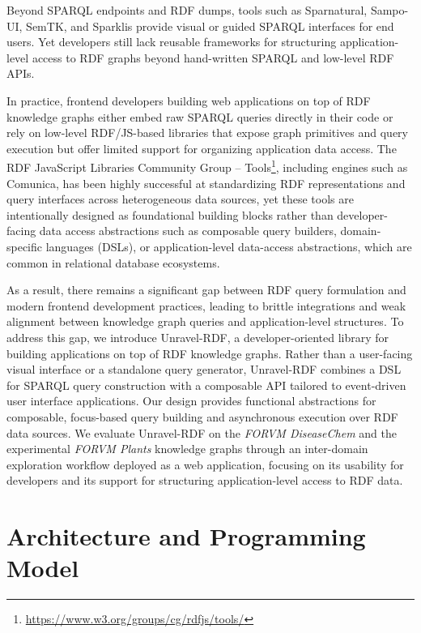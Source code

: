 \documentclass[
]{ceurart}
\begin{document}
Beyond SPARQL endpoints and RDF dumps, tools such as Sparnatural\citep{francart_sparnatural_2023}, 
Sampo-UI\citep{ikkala_sampo-ui_2021}, SemTK\citep{cuddihy_semtk_2017}, and Sparklis\citep{ferre_sparklis_2016} 
provide visual or guided SPARQL interfaces for end users. Yet developers still
lack reusable frameworks for structuring application-level access to RDF graphs
beyond hand-written SPARQL and low-level RDF APIs.

In practice, frontend developers building web applications on top of RDF
knowledge graphs either embed raw SPARQL queries directly in their code or rely
on low-level RDF/JS-based libraries that expose graph primitives and query
execution but offer limited support for organizing application data access. The
RDF JavaScript Libraries Community Group -- Tools\footnote{\url{https://www.w3.org/groups/cg/rdfjs/tools/}},
including engines such as Comunica\citep{taelman_comunica_2018}, has been
highly successful at standardizing RDF representations and query interfaces
across heterogeneous data sources, yet these tools are intentionally designed
as foundational building blocks rather than developer-facing data access
abstractions such as composable query builders, domain-specific languages
(DSLs), or application-level data-access abstractions, which are common 
in relational database ecosystems.

As a result, there remains a significant gap between RDF query formulation and
modern frontend development practices, leading to brittle integrations and weak
alignment between knowledge graph queries and application-level structures. To
address this gap, we introduce Unravel-RDF, a developer-oriented library for building
applications on top of RDF knowledge graphs. Rather than a user-facing visual 
interface or a standalone query generator, Unravel-RDF combines a DSL for SPARQL 
query construction with a composable API tailored to event-driven user 
interface applications. Our design provides functional abstractions for composable,
focus-based query building and asynchronous execution over RDF data
sources. We evaluate Unravel-RDF on the \textit{FORVM DiseaseChem}\citep{delmas_forum_2021} 
and the experimental \textit{FORVM Plants} knowledge graphs through 
an inter-domain exploration workflow deployed as a web application, 
focusing on its usability for developers and its support for structuring 
application-level access to RDF data.


\section{Architecture and Programming Model}
\end{document}
